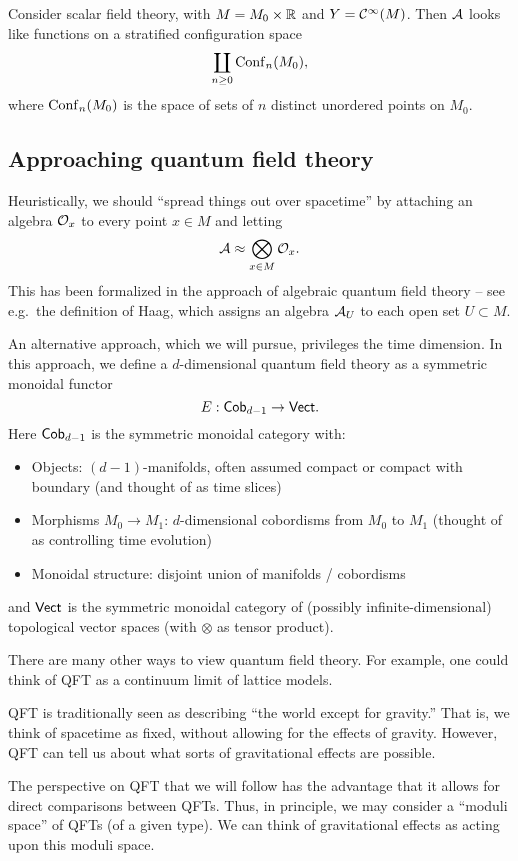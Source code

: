 \begin{ex}
	Consider scalar field theory, with $M = M_0 \times \mathbb{R}$ and $Y = \mathcal{C}^\infty(M)$.
	Then $\mathcal{A}$ looks like functions on a stratified configuration space
	\[
		\coprod_{n \geq 0} \mathrm{Conf}_n(M_0),
	\]
	where $\mathrm{Conf}_n(M_0)$ is the space of sets of $n$ distinct unordered points on $M_0$.
\end{ex}

\subsection{Approaching quantum field theory}

Heuristically, we should ``spread things out over spacetime'' by attaching an algebra $\mathcal{O}_x$ to every point $x \in M$ and letting
\[
	\mathcal{A} \approx \bigotimes_{x \in M} \mathcal{O}_x.
\]
This has been formalized in the approach of algebraic quantum field theory -- see e.g.\ the definition of Haag, which assigns an algebra $\mathcal{A}_U$ to each open set $U \subset M$.

An alternative approach, which we will pursue, privileges the time dimension.
In this approach, we define a $d$-dimensional quantum field theory as a symmetric monoidal functor
\[
	E: \mathsf{Cob}_{d-1} \to \mathsf{Vect}.
\]
Here $\mathsf{Cob}_{d-1}$ is the symmetric monoidal category with:
\begin{itemize}
	\item Objects: $(d - 1)$-manifolds, often assumed compact or compact with boundary (and thought of as time slices)
	\item Morphisms $M_0 \to M_1$: $d$-dimensional cobordisms from $M_0$ to $M_1$ (thought of as controlling time evolution)
	\item Monoidal structure: disjoint union of manifolds / cobordisms
\end{itemize}
and $\mathsf{Vect}$ is the symmetric monoidal category of (possibly infinite-dimensional) topological vector spaces (with $\otimes$ as tensor product).

There are many other ways to view quantum field theory.
For example, one could think of QFT as a continuum limit of lattice models.

QFT is traditionally seen as describing ``the world except for gravity.''
That is, we think of spacetime as fixed, without allowing for the effects of gravity.
However, QFT can tell us about what sorts of gravitational effects are possible.

The perspective on QFT that we will follow has the advantage that it allows for direct comparisons between QFTs.
Thus, in principle, we may consider a ``moduli space'' of QFTs (of a given type).
We can think of gravitational effects as acting upon this moduli space.

